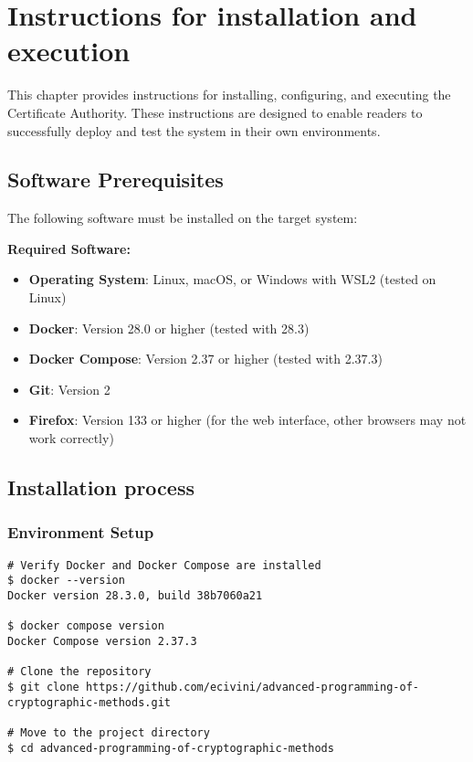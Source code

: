\chapter{Instructions for installation and execution}

This chapter provides instructions for installing, configuring, and executing the 
Certificate Authority. These instructions are designed to enable readers to successfully 
deploy and test the system in their own environments.

\section{Software Prerequisites}

The following software must be installed on the target system:

\textbf{Required Software:}
\begin{itemize}
    \item \textbf{Operating System}: Linux, macOS, or Windows with WSL2 (tested on Linux)
    \item \textbf{Docker}: Version 28.0 or higher (tested with 28.3)
    \item \textbf{Docker Compose}: Version 2.37 or higher (tested with 2.37.3)
    \item \textbf{Git}: Version 2
    \item \textbf{Firefox}: Version 133 or higher (for the web interface, other browsers may not work correctly)
\end{itemize}

\section{Installation process}

\subsection{Environment Setup}
\begin{verbatim}
# Verify Docker and Docker Compose are installed
$ docker --version
Docker version 28.3.0, build 38b7060a21

$ docker compose version
Docker Compose version 2.37.3

# Clone the repository 
$ git clone https://github.com/ecivini/advanced-programming-of-cryptographic-methods.git

# Move to the project directory
$ cd advanced-programming-of-cryptographic-methods
\end{verbatim}

